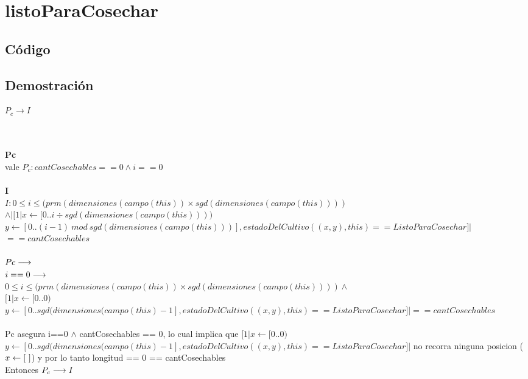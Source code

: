 \documentclass[a4paper]{article}
\begin{document}
\section{listoParaCosechar}

    \subsection{C\'odigo}
    

    \subsection{Demostraci\'on}
        \noindent
        \begin{large}
       {$P_c \rightarrow I$}
        \end{large} \\
        \\
        \textbf{Pc} \\
        vale $ P_c : cantCosechables == 0 \land i == 0$ \\
        \\
		\textbf{I} \\
        $ I: 0 \leq i \leq (prm(dimensiones(campo(this)) \times sgd(dimensiones(campo(this)))) $\\ $ \land | [1| x \leftarrow [0..i \div sgd(dimensiones(campo(this)))) $\\ $ y \leftarrow [0.. (i-1) \ mod \ sgd(dimensiones(campo(this)))], estadoDelCultivo((x,y), this) == ListoParaCosechar]| $\\$ == cantCosechables $\\   
\\ $Pc \longrightarrow$\\
$i == 0 \longrightarrow$\\
$ 0 \leq i \leq (prm(dimensiones(campo(this)) \times sgd(dimensiones(campo(this)))) \land $\\$
[1| x \leftarrow [0..0) $\\ $ y \leftarrow [0.. sgd(dimensiones(campo(this) - 1], estadoDelCultivo((x,y), this) == ListoParaCosechar]| == cantCosechables$\\
\\ Pc asegura i==0 $ \land $ cantCosechables == 0, lo cual implica que $ [1| x \leftarrow [0..0) $\\ $ y \leftarrow [0.. sgd(dimensiones(campo(this) - 1], estadoDelCultivo((x,y), this) == ListoParaCosechar]|$ no recorra ninguna posicion ( $x \leftarrow [\ ]$) y por lo tanto longitud == 0 == cantCosechables\\
Entonces $P_c \longrightarrow I$
\end{document}
